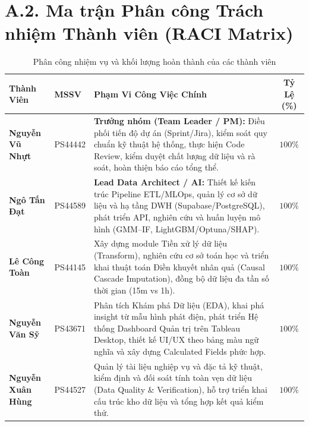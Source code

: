 \documentclass[12pt, a4paper]{report}
\begin{document}
\begin{table}[H]
\end{table}

\section*{A.2. Ma trận Phân công Trách nhiệm Thành viên (RACI Matrix)}

\begin{table}[H]
\centering
\caption{Phân công nhiệm vụ và khối lượng hoàn thành của các thành viên}
\label{tab:member_assignment}
\small
\renewcommand{\arraystretch}{1}
\begin{tabularx}{\textwidth}{@{} l l X c @{}}
\toprule
\textbf{Thành Viên} & \textbf{MSSV} & \textbf{Phạm Vi Công Việc Chính} & \textbf{Tỷ Lệ (\%)} \\
\midrule
\textbf{Nguyễn Vũ Nhựt} & PS44442 & 
\textbf{Trưởng nhóm (Team Leader / PM):} Điều phối tiến độ dự án (Sprint/Jira), kiểm soát quy chuẩn kỹ thuật hệ thống, thực hiện Code Review, kiểm duyệt chất lượng dữ liệu và rà soát, hoàn thiện báo cáo tổng thể. & 
$100\%$ \\
\midrule
\textbf{Ngô Tấn Đạt} & PS44589 & 
\textbf{Lead Data Architect / AI:} Thiết kế kiến trúc Pipeline ETL/MLOps, quản lý cơ sở dữ liệu và hạ tầng DWH (Supabase/PostgreSQL), phát triển API, nghiên cứu và huấn luyện mô hình (GMM--IF, LightGBM/Optuna/SHAP). & 
$100\%$ \\
\midrule
\textbf{Lê Công Toàn} & PS44145 & 
Xây dựng module Tiền xử lý dữ liệu (Transform), nghiên cứu cơ sở toán học và triển khai thuật toán Điền khuyết nhân quả (Causal Cascade Imputation), đồng bộ dữ liệu đa tần số thời gian (15m vs 1h). & 
$100\%$ \\
\midrule
\textbf{Nguyễn Văn Sỹ} & PS43671 & 
Phân tích Khám phá Dữ liệu (EDA), khai phá insight từ mẫu hình phát điện, phát triển Hệ thống Dashboard Quản trị trên Tableau Desktop, thiết kế UI/UX theo bảng màu ngữ nghĩa và xây dựng Calculated Fields phức hợp. & 
$100\%$ \\
\midrule
\textbf{Nguyễn Xuân Hùng} & PS44527 & 
Quản lý tài liệu nghiệp vụ và đặc tả kỹ thuật, kiểm định và đối soát tính toàn vẹn dữ liệu (Data Quality \& Verification), hỗ trợ triển khai cấu trúc kho dữ liệu và tổng hợp kết quả kiểm thử. & 
$100\%$ \\
\bottomrule
\end{tabularx}


\end{table}

\end{document}
